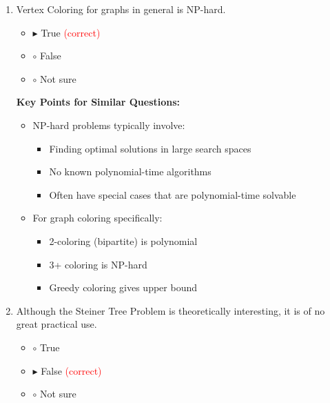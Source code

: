 \begin{enumerate}[label=\alph*)]
\item Vertex Coloring for graphs in general is NP-hard.
\begin{itemize}
\item $\blacktriangleright$ True \hspace{1em} \textcolor{red}{(correct)}
\item $\circ$ False
\item $\circ$ Not sure
\end{itemize}

\textbf{Key Points for Similar Questions:}
\begin{itemize}
\item NP-hard problems typically involve:
  \begin{itemize}
  \item Finding optimal solutions in large search spaces
  \item No known polynomial-time algorithms
  \item Often have special cases that are polynomial-time solvable
  \end{itemize}
\item For graph coloring specifically:
  \begin{itemize}
  \item 2-coloring (bipartite) is polynomial
  \item 3+ coloring is NP-hard
  \item Greedy coloring gives upper bound
  \end{itemize}
\end{itemize}

\item Although the Steiner Tree Problem is theoretically interesting, it is of no great practical use.
\begin{itemize}
\item $\circ$ True
\item $\blacktriangleright$ False \hspace{1em} \textcolor{red}{(correct)}
\item $\circ$ Not sure
\end{itemize}


\end{enumerate}
